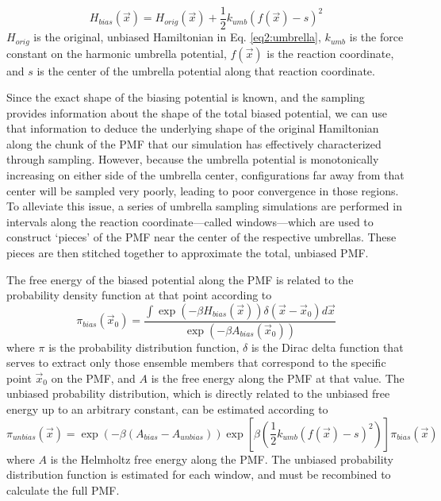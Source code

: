 \begin{equation}
   H_{bias}(\vec{x}) = H_{orig}(\vec{x}) + \frac 1 2 k_{umb}(f(\vec{x}) - s)^2
   \label{eq2:umbrella}
\end{equation}
$H_{orig}$ is the original, unbiased Hamiltonian in Eq. \ref{eq2:umbrella},
$k_{umb}$ is the force constant on the harmonic umbrella potential, $f(\vec{x})$
is the reaction coordinate, and $s$ is the center of the umbrella potential
along that reaction coordinate.

Since the exact shape of the biasing potential is known, and the sampling
provides information about the shape of the total biased potential, we can use
that information to deduce the underlying shape of the original Hamiltonian
along the chunk of the PMF that our simulation has effectively characterized
through sampling. However, because the umbrella potential is monotonically
increasing on either side of the umbrella center, configurations far away from
that center will be sampled very poorly, leading to poor convergence in those
regions. To alleviate this issue, a series of umbrella sampling simulations are
performed in intervals along the reaction coordinate---called windows---which
are used to construct `pieces' of the PMF near the center of the respective
umbrellas. These pieces are then stitched together to approximate the total,
unbiased PMF.

The free energy of the biased potential along the PMF is related to the
probability density function at that point according to
\begin{equation*}
   \pi_{bias}(\vec{x}_0) = \frac {\int \exp \left( -\beta H_{bias} (\vec{x})
         \right) \delta (\vec{x} - \vec{x}_0) d\vec{x}}
         {\exp\left(-\beta A_{bias}(\vec{x}_0)\right)}
\end{equation*}
where $\pi$ is the probability distribution function, $\delta$ is the Dirac
delta function that serves to extract only those ensemble members that
correspond to the specific point $\vec{x}_0$ on the PMF, and $A$ is the free
energy along the PMF at that value. The unbiased probability distribution, which
is directly related to the unbiased free energy up to an arbitrary constant, can
be estimated according to \cite{Tuckerman_Book_StatMech_TheoryAndSim}
\begin{equation*}
   \pi_{unbias}(\vec{x}) = \exp\left(-\beta(A_{bias}-A_{unbias}) \right)
                  \exp\left[\beta\left(\frac 1 2 k_{umb}(f(\vec{x})-s)^2 \right)
                  \right] \pi_{bias}(\vec{x})
\end{equation*}
where $A$ is the Helmholtz free energy along the PMF. The unbiased probability
distribution function is estimated for each window, and must be recombined to
calculate the full PMF. \cite{Tuckerman_Book_StatMech_TheoryAndSim}

